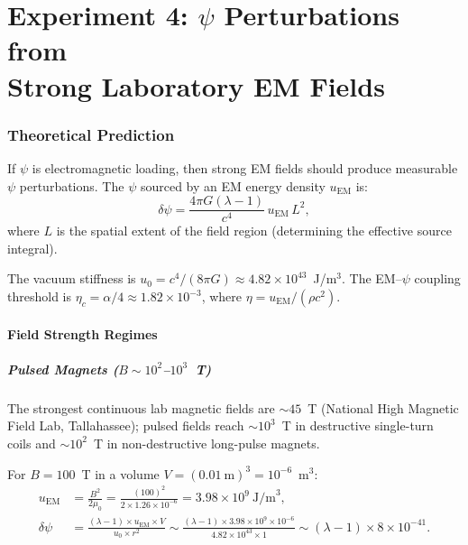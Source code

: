 \documentclass[11pt]{article}
\newcommand{\ee}[1]{\times 10^{#1}}
\newcommand{\lam}{\lambda}
\newcommand{\dpsi}{\delta\psi}
\begin{document}
\part{Experiment 4: $\psi$ Perturbations from\\
Strong Laboratory EM Fields}
\label{part:strong-em}


\section{Theoretical Prediction}
\label{sec:strong-em-theory}

If $\psi$ is electromagnetic loading, then strong EM fields should
produce measurable $\psi$ perturbations.  The $\psi$ sourced by an
EM energy density $u_{\text{EM}}$ is:
\begin{equation}
\dpsi = \frac{4\pi G(\lam - 1)}{c^4}\, u_{\text{EM}}\, L^2,
\label{eq:dpsi-em}
\end{equation}
where $L$ is the spatial extent of the field region (determining the
effective source integral).

The vacuum stiffness is $u_0 = c^4/(8\pi G) \approx 4.82\ee{43}$~J/m$^3$.
The EM--$\psi$ coupling threshold is $\eta_c = \alpha/4 \approx
1.82\ee{-3}$, where $\eta = u_{\text{EM}}/(\rho c^2)$.

\subsection{Field Strength Regimes}

\subsubsection{Pulsed Magnets ($B \sim 10^2$--$10^3$~T)}

The strongest continuous lab magnetic fields are $\sim 45$~T
(National High Magnetic Field Lab, Tallahassee); pulsed fields
reach $\sim 10^3$~T in destructive single-turn coils and
$\sim 10^2$~T in non-destructive long-pulse magnets.

For $B = 100$~T in a volume $V = (0.01~\text{m})^3 = 10^{-6}$~m$^3$:
\begin{align}
u_{\text{EM}} &= \frac{B^2}{2\mu_0}
= \frac{(100)^2}{2 \times 1.26\ee{-6}}
= 3.98\ee{9}~\text{J/m}^3, \\
\dpsi &= \frac{(\lam - 1) \times u_{\text{EM}} \times V}{u_0 \times r^2}
\sim \frac{(\lam - 1) \times 3.98\ee{9} \times 10^{-6}}
{4.82\ee{43} \times 1}
\sim (\lam - 1) \times 8\ee{-41}.
\end{align}
\end{document}
